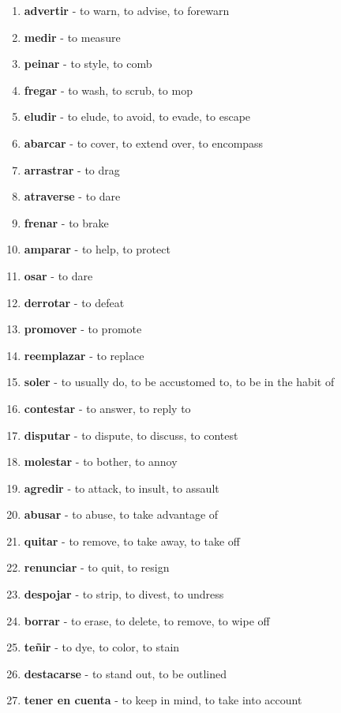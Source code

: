 \documentclass[12pt]{article}
\begin{document}
\begin{enumerate}
                \item \textbf{advertir} - to warn, to advise, to forewarn
                \item \textbf{medir} - to measure
                \item \textbf{peinar} - to style, to comb
                \item \textbf{fregar} - to wash, to scrub, to mop
                \item \textbf{eludir} - to elude, to avoid, to evade, to escape
                \item \textbf{abarcar} - to cover, to extend over, to encompass
                \item \textbf{arrastrar} - to drag
                \item \textbf{atraverse} - to dare
                \item \textbf{frenar} - to brake
                \item \textbf{amparar} - to help, to protect
                \item \textbf{osar} - to dare
                \item \textbf{derrotar} - to defeat
                \item \textbf{promover} - to promote
                \item \textbf{reemplazar} - to replace
                \item \textbf{soler} - to usually do, to be accustomed to, to be in the habit of
                \item \textbf{contestar} - to answer, to reply to
                \item \textbf{disputar} - to dispute, to discuss, to contest
                \item \textbf{molestar} - to bother, to annoy
                \item \textbf{agredir} - to attack, to insult, to assault
                \item \textbf{abusar} - to abuse, to take advantage of
                \item \textbf{quitar} - to remove, to take away, to take off
                \item \textbf{renunciar} - to quit, to resign
                \item \textbf{despojar} - to strip, to divest, to undress
                \item \textbf{borrar} - to erase, to delete, to remove, to wipe off
                \item \textbf{teñir} - to dye, to color, to stain
                \item \textbf{destacarse} - to stand out, to be outlined
                \item \textbf{tener en cuenta} - to keep in mind, to take into account
            \end{enumerate}
\end{document}
